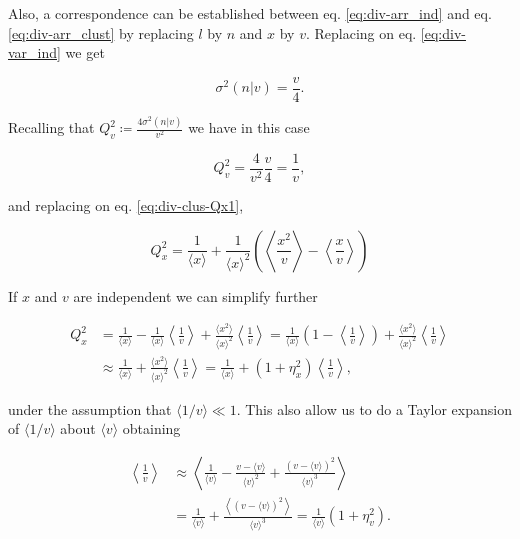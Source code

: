 Also, a correspondence can be established between eq. \eqref{eq:div-arr_ind} and eq. \eqref{eq:div-arr_clust} by replacing $l$ by $n$ and $x$ by $v$. Replacing on eq. \eqref{eq:div-var_ind} we get

\begin{equation*}
  \sigma^2(n|v) = \frac{v}{4}.
\end{equation*}

Recalling that $Q_v^2 \coloneqq \frac{4\sigma^2(n|v)}{v^2}$ we have in this case

\begin{equation*}
  Q_v^2 = \frac{4}{v^2}\frac{v}{4} = \frac{1}{v},
\end{equation*}

and replacing on eq. \eqref{eq:div-clus-Qx1},

\begin{equation}
  \label{eq:div-clus-Qx2}
  Q_x^2 = \frac{1}{\langle x\rangle} + \frac{1}{\langle x\rangle^2}\left(\left\langle \frac{x^2}{v}\right\rangle-\left\langle \frac{x}{v}\right\rangle \right)
\end{equation}

If $x$ and $v$ are independent we can simplify further

\begin{equation}
  \label{eq:div-Qx_vesic_almost}
  \begin{split}
    Q_x^2 &= \frac{1}{\langle x\rangle} - \frac{1}{\langle x\rangle}\left\langle\frac{1}{v}\right\rangle + \frac{\langle x^2\rangle}{\langle x\rangle^2}\left\langle\frac{1}{v}\right\rangle = \frac{1}{\langle x\rangle}\left(1-\left\langle\frac{1}{v}\right\rangle\right)+\frac{\langle x^2\rangle}{\langle x\rangle^2}\left\langle\frac{1}{v}\right\rangle\\
  &\approx \frac{1}{\langle x\rangle} + \frac{\langle x^2\rangle}{\langle x\rangle^2}\left\langle\frac{1}{v}\right\rangle = \frac{1}{\langle x\rangle} + \left(1+\eta_x^2\right)\left\langle\frac{1}{v}\right\rangle,
  \end{split}
\end{equation}

under the assumption that $\langle 1/v\rangle \ll 1$. This also allow us to do a Taylor expansion of $\langle 1/v\rangle$ about $\langle v\rangle$ obtaining

\begin{equation*}
  \begin{split}
    \left\langle\frac{1}{v}\right\rangle &\approx \left\langle \frac{1}{\langle v\rangle} - \frac{v-\langle v\rangle}{\langle v\rangle^2} + \frac{(v-\langle v\rangle)^2}{\langle v\rangle^3}\right\rangle\\
    &=\frac{1}{\langle v\rangle} + \frac{\left\langle(v-\langle v\rangle)^2\right\rangle}{\langle v\rangle^3} = \frac{1}{\langle v\rangle}\left(1+\eta_v^2\right).
  \end{split}
\end{equation*}

